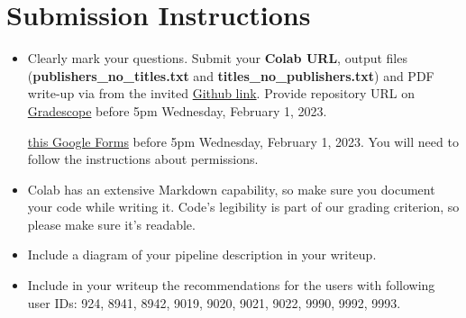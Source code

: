 \documentclass[paper=a4, fontsize=11pt]{scrartcl} %
\begin{document}
\section{Submission Instructions}

\begin{itemize}
    \item Clearly mark your questions. Submit your \textbf{Colab URL}, output files (\textbf{publishers\_no\_titles.txt} and \textbf{titles\_no\_publishers.txt}) and PDF write-up via from the invited \href{https://classroom.github.com/a/Kog9MCRN}{Github link}. Provide repository URL on \href{https://www.gradescope.com/courses/494275}{Gradescope} before 5pm Wednesday, February 1, 2023.
    
    \href{https://docs.google.com/forms/d/e/1FAIpQLSfUfjMu0JPzuYqisZux2cvh1EfMH-D9MbkFFYjxp-yuRtLLvg/viewform}{this Google Forms} before 5pm Wednesday, February 1, 2023. You will need to follow the instructions about permissions.
    \item Colab has an extensive Markdown capability, so make sure you document your code while writing it. Code’s legibility is part of our grading criterion, so please make sure it’s readable.
    \item Include a diagram of your pipeline description in your writeup.
    \item Include in your writeup the recommendations for the users with following user IDs: 924, 8941, 8942, 9019, 9020, 9021, 9022, 9990, 9992, 9993.
\end{itemize}
\end{document}
